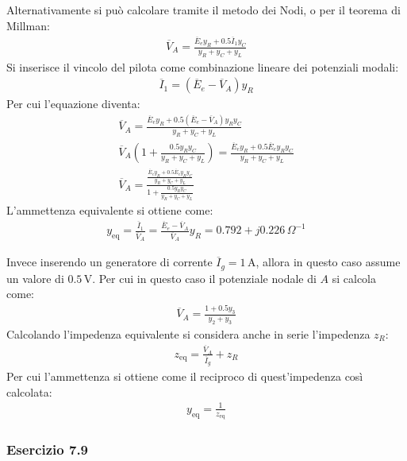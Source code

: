 \documentclass{article}
\newcommand{\SI}[1]{\,\mathrm{#1}}
\begin{document}
Alternativamente si può calcolare tramite il metodo dei Nodi, o per il teorema di Millman:
\begin{gather*}
    \overline{V}_A=\displaystyle\frac{\overline{E}_ey_R+0.5\overline{I}_1y_C}{y_R+y_C+y_L}
\end{gather*}
Si inserisce il vincolo del pilota come combinazione lineare dei potenziali modali:
\begin{gather*}
    \overline{I}_1=(\overline{E}_e-\overline{V}_A)y_R
\end{gather*}
Per cui l'equazione diventa:
\begin{gather*}
    \overline{V}_A=\displaystyle\frac{\overline{E}_ey_R+0.5(\overline{E}_e-\overline{V}_A)y_Ry_C}{y_R+y_C+y_L}\\
    \overline{V}_A\left(1+\displaystyle\frac{0.5y_Ry_C}{y_R+y_C+y_L}\right)=\frac{\overline{E}_ey_R+0.5\overline{E}_ey_Ry_C}{y_R+y_C+y_L}\\
    \overline{V}_A=\displaystyle\frac{\frac{\overline{E}_ey_R+0.5\overline{E}_ey_Ry_C}{y_R+y_C+y_L}}{1+\frac{0.5y_Ry_C}{y_R+y_C+y_L}}
\end{gather*}
L'ammettenza equivalente si ottiene come:
\begin{gather}
    y_\mathrm{eq}=\displaystyle\frac{\overline{I}_1}{\overline{V}_A}=\frac{\overline{E}_e-\overline{V}_A}{\overline{V}_A}y_R=0.792+j0.226\,\Omega^{-1}
\end{gather}


Invece inserendo un generatore di corrente $\overline{I}_g=1\SI{A}$, allora in questo caso assume un valore di $0.5\SI{V}$. Per cui in questo caso il potenziale nodale di $A$ si 
calcola come:
\begin{gather*}
    \overline{V}_A=\displaystyle\frac{1+0.5y_3}{y_2+y_3}
\end{gather*}
Calcolando l'impedenza equivalente si considera anche in serie l'impedenza $z_R$:
\begin{gather*}
    z_\mathrm{eq}=\displaystyle\frac{\overline{V}_A}{\overline{I}_g}+z_R
\end{gather*}
Per cui l'ammettenza si ottiene come il reciproco di quest'impedenza così calcolata:
\begin{gather*}
    y_\mathrm{eq}=\displaystyle\frac{1}{z_\mathrm{eq}}
\end{gather*}

\subsubsection*{Esercizio 7.9}
\end{document}
